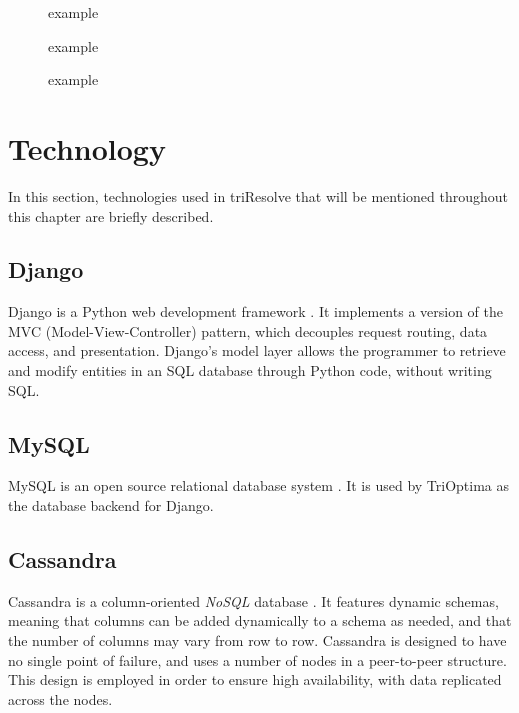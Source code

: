 \begin{figure}[ht]
  \centering
  \caption{ example}
  \label{fig:code_pipe_example}
\end{figure}

\begin{figure}[ht]
  \centering
  \caption{ example}
  \label{fig:code_queue_example}
\end{figure}

\begin{figure}[ht]
  \centering
  \caption{ example}
  \label{fig:code_pool_example}
\end{figure}


\section{Technology}
In this section, technologies used in triResolve that will be mentioned throughout this chapter are briefly described.

\subsection{Django}
Django is a Python web development framework \cite{holovaty_chapter_c1itd}. It implements a version of the MVC (Model-View-Controller) pattern, which decouples request routing, data access, and
presentation. Django's model layer allows the programmer to retrieve and modify entities in an SQL database through Python code, without writing SQL.

\subsection{MySQL}
MySQL is an open source relational database system \cite{what_wim}. It is used by TriOptima as the database backend for Django.

\subsection{Cassandra}
Cassandra is a column-oriented \textit{NoSQL} database \cite[p. 1-9]{mishra_2014_beginning_bacd}. It features dynamic schemas, meaning that columns can be added dynamically to a schema as needed, and that
the number of columns may vary from row to row. Cassandra is designed to have no single point of failure, and uses a number of nodes in a peer-to-peer structure. This design is
employed in order to ensure high availability, with data replicated across the nodes.

